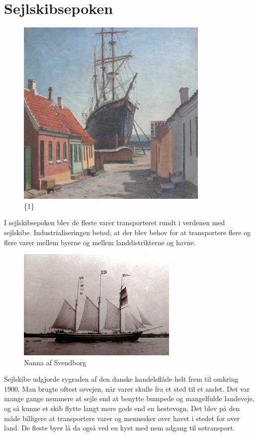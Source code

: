 \part{Sejlskibsepoken}

\begin{figure}
\centering
\includegraphics{images/epoker_sejlskibe.jpg}
\caption{\{1\}}
\end{figure}

\begin{intro}
I sejlskibsepoken blev de fleste varer transporteret rundt i verdenen med
sejlskibe. Industrialiseringen betød, at der blev behov for at
transportere flere og flere varer mellem byerne og mellem
landdistrikterne og havne.%
\end{intro}

\begin{figure}
\centering
\includegraphics{images/sejlskibe_indledning-nanna.jpg}
\caption{Nanna af Svendborg}
\end{figure}

Sejlskibe udgjorde rygraden af den danske handelsflåde helt frem til
omkring 1900. Man brugte oftest søvejen, når varer skulle fra et sted
til et andet. Det var mange gange nemmere at sejle end at benytte
bumpede og mangelfulde landeveje, og så kunne et skib flytte langt mere
gods end en hestevogn. Det blev på den måde billigere at transportere
varer og mennesker over havet i stedet for over land. De fleste byer lå
da også ved en kyst med nem adgang til søtransport.

